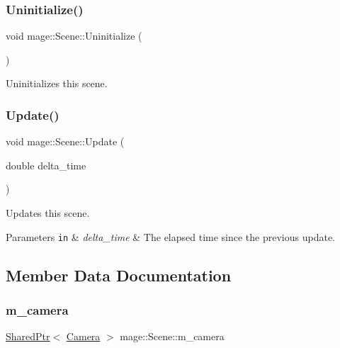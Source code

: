 \hypertarget{classmage_1_1_scene_a714dc33c04dc2b8e2cec93564905b174}{}\label{classmage_1_1_scene_a714dc33c04dc2b8e2cec93564905b174} 
\subsubsection{\texorpdfstring{Uninitialize()}{Uninitialize()}}
{\footnotesize\ttfamily void mage\+::\+Scene\+::\+Uninitialize (\begin{DoxyParamCaption}{ }\end{DoxyParamCaption})}

Uninitializes this scene. \hypertarget{classmage_1_1_scene_aa10e6eafc00834f63f146589326cbfe2}{}\label{classmage_1_1_scene_aa10e6eafc00834f63f146589326cbfe2} 
\subsubsection{\texorpdfstring{Update()}{Update()}}
{\footnotesize\ttfamily void mage\+::\+Scene\+::\+Update (\begin{DoxyParamCaption}\item[{double}]{delta\+\_\+time }\end{DoxyParamCaption})}

Updates this scene.


\begin{DoxyParams}[1]{Parameters}
\mbox{\tt in}  & {\em delta\+\_\+time} & The elapsed time since the previous update. \\
\hline
\end{DoxyParams}


\subsection{Member Data Documentation}
\hypertarget{classmage_1_1_scene_a961c280659f9934441d8e835508e933d}{}\label{classmage_1_1_scene_a961c280659f9934441d8e835508e933d} 
\subsubsection{\texorpdfstring{m\+\_\+camera}{m\_camera}}
{\footnotesize\ttfamily \hyperlink{namespacemage_a1e01ae66713838a7a67d30e44c67703e}{Shared\+Ptr}$<$ \hyperlink{classmage_1_1_camera}{Camera} $>$ mage\+::\+Scene\+::m\+\_\+camera\hspace{0.3cm}{\ttfamily [private]}}

